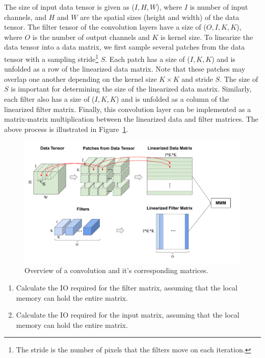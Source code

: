 \documentclass[a4 paper]{article}
\begin{document}
The size of input data tensor is given as ($I, H, W$), where $I$ is number of input channels, and $H$ and $W$ are the spatial sizes (height and width) of the data tensor. 
The filter tensor of the convolution layers have a size of ($O, I, K, K$), where $O$ is the number of output channels and $K$ is kernel size.
To linearize the data tensor into a data matrix, we first sample several patches from the data tensor with a sampling stride\footnote{The stride is the number of pixels that the filters move on each iteration.} $S$.
Each patch has a size of ($I, K, K$) and is unfolded as a row of the linearized data matrix. 
Note that these patches may overlap one another depending on the kernel size $K \times K$ and stride $S$. 
The size of $S$ is important for determining the size of the linearized data matrix.
Similarly, each filter also has a size of ($I, K, K$) and is unfolded as a column of the linearized filter matrix.
Finally, this convolution layer can be implemented as a matrix-matrix multiplication between the linearized data and filter matrices.
The above process is illustrated in Figure~\ref{fig:conv}.

\begin{figure}
    \centering
    \includegraphics[width=\linewidth]{figures/CS242-Conv.pdf}
    \caption{Overview of a convolution and it's corresponding matrices.}
    \label{fig:conv}
\end{figure}

\begin{enumerate}[label=(\alph*)]
    \item Calculate the IO required for the filter matrix, assuming that the local memory can hold the entire matrix.
    \item Calculate the IO required for the input matrix, assuming that the local memory can hold the entire matrix.
\end{enumerate}
\end{document}
